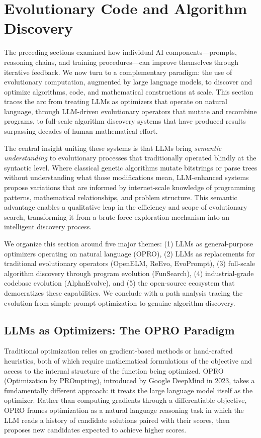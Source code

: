 \section{Evolutionary Code and Algorithm Discovery}
\label{sec:evolutionary-code}

The preceding sections examined how individual AI components---prompts, reasoning chains, and training procedures---can improve themselves through iterative feedback. We now turn to a complementary paradigm: the use of evolutionary computation, augmented by large language models, to discover and optimize algorithms, code, and mathematical constructions at scale. This section traces the arc from treating LLMs as optimizers that operate on natural language, through LLM-driven evolutionary operators that mutate and recombine programs, to full-scale algorithm discovery systems that have produced results surpassing decades of human mathematical effort.

The central insight uniting these systems is that LLMs bring \emph{semantic understanding} to evolutionary processes that traditionally operated blindly at the syntactic level. Where classical genetic algorithms mutate bitstrings or parse trees without understanding what those modifications mean, LLM-enhanced systems propose variations that are informed by internet-scale knowledge of programming patterns, mathematical relationships, and problem structure. This semantic advantage enables a qualitative leap in the efficiency and scope of evolutionary search, transforming it from a brute-force exploration mechanism into an intelligent discovery process.

We organize this section around five major themes: (1) LLMs as general-purpose optimizers operating on natural language (OPRO), (2) LLMs as replacements for traditional evolutionary operators (OpenELM, ReEvo, EvoPrompt), (3) full-scale algorithm discovery through program evolution (FunSearch), (4) industrial-grade codebase evolution (AlphaEvolve), and (5) the open-source ecosystem that democratizes these capabilities. We conclude with a path analysis tracing the evolution from simple prompt optimization to genuine algorithm discovery.

\subsection{LLMs as Optimizers: The OPRO Paradigm}
\label{sec:opro}

Traditional optimization relies on gradient-based methods or hand-crafted heuristics, both of which require mathematical formulations of the objective and access to the internal structure of the function being optimized. OPRO~\citep{yang2023opro} (Optimization by PROmpting), introduced by Google DeepMind in 2023, takes a fundamentally different approach: it treats the large language model itself as the optimizer. Rather than computing gradients through a differentiable objective, OPRO frames optimization as a natural language reasoning task in which the LLM reads a history of candidate solutions paired with their scores, then proposes new candidates expected to achieve higher scores.

